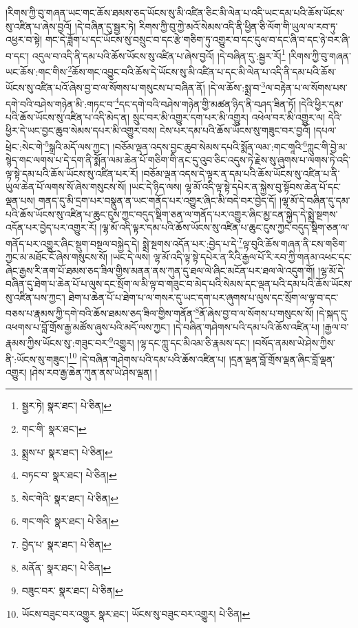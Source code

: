 །རིགས་ཀྱི་བུ་གཞན་ཡང་གང་ཆོས་ཐམས་ཅད་ཡོངས་སུ་མི་འཛིན་ཅིང་མི་ལེན་པ་འདི་ཡང་དམ་པའི་ཆོས་ཡོངས་སུ་འཛིན་པ་ཞེས་བྱའོ། །དེ་བཞིན་དུ་སྦྱར་ཏེ། རིགས་ཀྱི་བུ་ཀྱེ་མའོ་སེམས་འདི་ནི་ཕྱིན་ཅི་ལོག་གི་ཡུལ་ལ་རབ་ཏུ་འཕྱར་བ་སྟེ། གང་དེ་ཟློག་པ་དང་ཡོངས་སུ་བསྲུང་བ་དང་རྩེ་གཅིག་ཏུ་འགྱུར་བ་དང་དུལ་བ་དང་ཞི་བ་དང་ཉེ་བར་ཞི་བ་དང་། འདུལ་བ་འདི་ནི་དམ་པའི་ཆོས་ཡོངས་སུ་འཛིན་པ་ཞེས་བྱའོ། །དེ་བཞིན་དུ་:སྦྱར་རོ།\footnote{སྦྱར་ཏེ།  སྣར་ཐང་།  པེ་ཅིན། } །རིགས་ཀྱི་བུ་གཞན་ཡང་ཆོས་:གང་གིས་\footnote{གང་གི་  སྣར་ཐང་། }ཆོས་གང་འབྱུང་བའི་ཆོས་དེ་ཡོངས་སུ་མི་འཛིན་པ་དང་མི་ལེན་པ་འདི་ནི་དམ་པའི་ཆོས་ཡོངས་སུ་འཛིན་པའོ་ཞེས་བྱ་བ་ལ་སོགས་པ་གསུངས་པ་བཞིན་ནོ། །དེ་ལ་ཆོས་:སྨྲ་བ་\footnote{སྨྲས་པ་  སྣར་ཐང་།  པེ་ཅིན། }ལ་བརྟེན་པ་ལ་སོགས་པས་དགེ་བའི་བཤེས་གཉེན་མི་:གཏང་བ་\footnote{བཏང་བ་  སྣར་ཐང་།  པེ་ཅིན། }དང་དགེ་བའི་བཤེས་གཉེན་གྱི་མཚན་ཉིད་ནི་བཤད་ཟིན་ཏོ། །དེའི་ཕྱིར་དམ་པའི་ཆོས་ཡོངས་སུ་འཛིན་པ་འདི་མེད་ན། སྲུང་བར་མི་འགྱུར་དག་པར་མི་འགྱུར། འཕེལ་བར་མི་འགྱུར་ལ། དེའི་ཕྱིར་དེ་ཡང་བྱང་ཆུབ་སེམས་དཔར་མི་འགྱུར་བས། ངེས་པར་དམ་པའི་ཆོས་ཡོངས་སུ་གཟུང་བར་བྱའོ། །དཔལ་ཕྲེང་:སེང་གེ་\footnote{སེང་གེའི་  སྣར་ཐང་།  པེ་ཅིན། }སྒྲའི་མདོ་ལས་ཀྱང་། །བཅོམ་ལྡན་འདས་བྱང་ཆུབ་སེམས་དཔའི་སྨོན་ལམ་:གང་གཱའི་\footnote{གང་གའི་  སྣར་ཐང་།  པེ་ཅིན། }ཀླུང་གི་བྱེ་མ་སྙེད་གང་ལགས་པ་དེ་དག་ནི་སྨོན་ལམ་ཆེན་པོ་གཅིག་གི་ནང་དུ་འུབ་ཅིང་འདུས་ཏེ་རྗེས་སུ་ཞུགས་པ་ལགས་ཏེ་འདི་ལྟ་སྟེ་དམ་པའི་ཆོས་ཡོངས་སུ་འཛིན་པར་རོ། །བཅོམ་ལྡན་འདས་དེ་ལྟར་ན་དམ་པའི་ཆོས་ཡོངས་སུ་འཛིན་པ་ནི་ཡུལ་ཆེན་པོ་ལགས་སོ་ཞེས་གསུངས་སོ། །ཡང་དེ་ཉིད་ལས། ལྷ་མོ་འདི་ལྟ་སྟེ་དཔེར་ན་སྐྱེས་བུ་སྟོབས་ཆེན་པོ་དང་ལྡན་པས། གནད་དུ་མི་དྲག་པར་བསྣུན་ན་ཡང་གནོད་པར་འགྱུར་ཞིང་མི་བདེ་བར་བྱེད་དོ། །ལྷ་མོ་དེ་བཞིན་དུ་དམ་པའི་ཆོས་ཡོངས་སུ་འཛིན་པ་ཆུང་ངུས་ཀྱང་བདུད་སྡིག་ཅན་ལ་གནོད་པར་འགྱུར་ཞིང་མྱ་ངན་སྐྱེད་དེ་སྨྲེ་སྔགས་འདོན་པར་བྱེད་པར་འགྱུར་རོ། །ལྷ་མོ་འདི་ལྟར་དམ་པའི་ཆོས་ཡོངས་སུ་འཛིན་པ་ཆུང་ངུས་ཀྱང་བདུད་སྡིག་ཅན་ལ་གནོད་པར་འགྱུར་ཞིང་སྡུག་བསྔལ་བསྐྱེད་དེ། སྨྲེ་སྔགས་འདོན་པར་:བྱེད་པ་དེ་\footnote{བྱེད་པ་  སྣར་ཐང་།  པེ་ཅིན། }ལྟ་བུའི་ཆོས་གཞན་ནི་ངས་གཅིག་ཀྱང་མ་མཐོང་ངོ་ཞེས་གསུངས་སོ། །ཡང་དེ་ལས། ལྷ་མོ་འདི་ལྟ་སྟེ་དཔེར་ན་རིའི་རྒྱལ་པོ་རི་རབ་ཀྱི་གནམ་འཕང་དང་ཞེང་རྒྱས་རི་ནག་པོ་ཐམས་ཅད་ཟིལ་གྱིས་མནན་ནས་ཀུན་དུ་ཐལ་ལེ་ཞིང་མངོན་པར་ཐལ་ལེ་འདུག་གོ། །ལྷ་མོ་དེ་བཞིན་དུ་ཐེག་པ་ཆེན་པོ་པ་ལུས་དང་སྲོག་ལ་མི་ལྟ་བ་གཟུང་བ་མེད་པའི་སེམས་དང་ལྡན་པའི་དམ་པའི་ཆོས་ཡོངས་སུ་འཛིན་པས་ཀྱང་། ཐེག་པ་ཆེན་པོ་པ་ཐེག་པ་ལ་གསར་དུ་ཡང་དག་པར་ཞུགས་པ་ལུས་དང་སྲོག་ལ་ལྟ་བ་དང་བཅས་པ་རྣམས་ཀྱི་དགེ་བའི་ཆོས་ཐམས་ཅད་ཟིལ་གྱིས་གནོན་\footnote{མནོན་  སྣར་ཐང་།  པེ་ཅིན། }ནོ་ཞེས་བྱ་བ་ལ་སོགས་པ་གསུངས་སོ། །དེ་སྐད་དུ་འཕགས་པ་བློ་གྲོས་རྒྱ་མཚོས་ཞུས་པའི་མདོ་ལས་ཀྱང་། །དེ་བཞིན་གཤེགས་པའི་དམ་པའི་ཆོས་འཛིན་པ། །རྒྱལ་བ་རྣམས་ཀྱིས་ཡོངས་སུ་:གཟུང་བར་\footnote{བཟུང་བར་  སྣར་ཐང་།  པེ་ཅིན། }འགྱུར། །ལྷ་དང་ཀླུ་དང་མིའམ་ཅི་རྣམས་དང་། །བསོད་ནམས་ཡེ་ཤེས་ཀྱིས་ནི་:ཡོངས་སུ་གཟུང་།\footnote{ཡོངས་བཟུང་བར་འགྱུར  སྣར་ཐང་། ཡོངས་སུ་བཟུང་བར་འགྱུར།  པེ་ཅིན། } །དེ་བཞིན་གཤེགས་པའི་དམ་པའི་ཆོས་འཛིན་པ། །དྲན་ལྡན་བློ་གྲོས་ལྡན་ཞིང་བློ་ལྡན་འགྱུར། །ཤེས་རབ་རྒྱ་ཆེན་ཀུན་ནས་ཡེ་ཤེས་ལྡན། །
